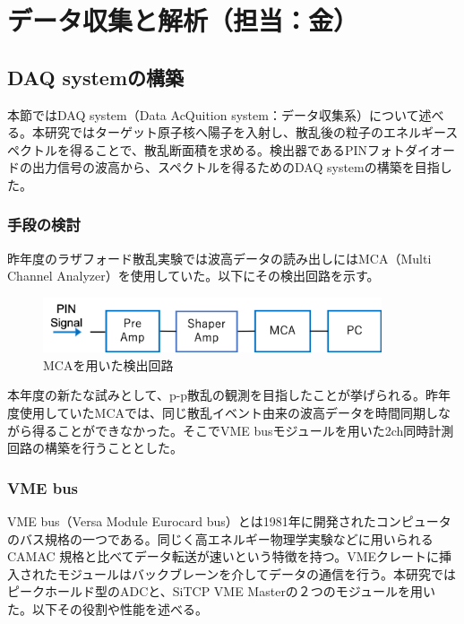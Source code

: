\documentclass[a4paper,11pt,dvipdfmx]{jsarticle}
\begin{document}
\newpage
\section{\LARGE{データ収集と解析（担当：金）}}

\subsection{DAQ systemの構築}
本節ではDAQ system（Data AcQuition system：データ収集系）について述べる。本研究ではターゲット原子核へ陽子を入射し、散乱後の粒子のエネルギースペクトルを得ることで、散乱断面積を求める。検出器であるPINフォトダイオードの出力信号の波高から、スペクトルを得るためのDAQ systemの構築を目指した。
\subsubsection{手段の検討}
昨年度のラザフォード散乱実験\cite{2019}では波高データの読み出しにはMCA（Multi Channel Analyzer）を使用していた。以下にその検出回路を示す。

\vspace*{5mm}

\begin{figure}[H]
\centering
\includegraphics[width=100mm]{picture/daq/MCA.png}
\caption{MCAを用いた検出回路}
\label{MCA}
\end{figure}

\vspace*{5mm}

本年度の新たな試みとして、p-p散乱の観測を目指したことが挙げられる。昨年度使用していたMCAでは、同じ散乱イベント由来の波高データを時間同期しながら得ることができなかった。そこでVME busモジュールを用いた2ch同時計測回路の構築を行うこととした。

\subsubsection{VME bus}
VME bus（Versa Module Eurocard bus）とは1981年に開発されたコンピュータのバス規格の一つである。同じく高エネルギー物理学実験などに用いられるCAMAC 規格と比べてデータ転送が速いという特徴を持つ。VMEクレートに挿入されたモジュールはバックブレーンを介してデータの通信を行う。本研究ではピークホールド型のADCと、SiTCP VME Masterの２つのモジュールを用いた。以下その役割や性能を述べる。
\end{document}
